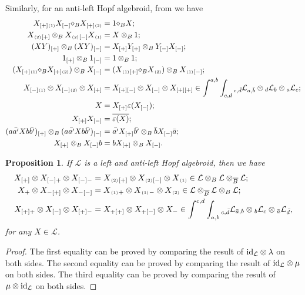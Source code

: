 \documentclass[a4paper,reqno]{amsart}
\newcommand*{\id}{\textup{id}}
\numberwithin{equation}{section}
\theoremstyle{plain}
\newtheorem{prop}[thm]{Proposition}
\theoremstyle{remark}
\numberwithin{equation}{section}
\newcommand{\ot}{\otimes}
\newcommand{\cL}{\mathcal{L}}
\newcommand{\BB}{\overline{B}}
\newcommand{\one}[1]{{#1}{}_{\scriptscriptstyle{(1)}}}
\newcommand{\two}[1]{{#1}{}_{\scriptscriptstyle{(2)}}}
\renewcommand{\o}{{}_{\scriptscriptstyle{(1)}}}
\renewcommand{\t}{{}_{\scriptscriptstyle{(2)}}}
\newcommand{\di}{{\diamond_{B}}}
\begin{document}
Similarly, for an anti-left Hopf algebroid, from \cite{BS} we have
\begin{align}
    \one{X_{[+]}}X_{[-]}\di{}\two{X_{[+]}}&=1\di{}X\label{equ. inverse mu 1};\\
    \two{X}{}_{[+]}\ot_{B}\two{X}{}_{[-]}\one{X}&=X\ot_{B}1\label{equ. inverse mu 2};\\
    (XY)_{[+]}\ot_{B}(XY)_{[-]}&=X_{[+]}Y_{[+]}\ot_{B}Y_{[-]}X_{[-]}\label{equ. inverse mu 3};\\
    1_{[+]}\ot_{B}1_{[-]}&=1\ot_{B}1\label{equ. inverse mu 4};\\
    (\one{X_{[+]}}\di{}\two{X_{[+]}})\ot_{B}X_{[-]}&=(\one{X}{}_{[+]}\di{}\two{X})\ot_{B}\one{X}{}_{[-]}\label{equ. inverse mu 5};\\
    \one{X_{[-]}}\ot{}\two{X_{[-]}}\ot X_{[+]}&=X_{[+][-]}\ot{}X_{[-]}\ot X_{[+][+]}\in \int^{a,b}\int_{c,d}{}_{c,\Bar{d}}\cL_{a,\Bar{b}}\ot {}_{d}\cL_{b}\ot {}_{a}\cL_{c}\label{equ. inverse mu 6};\\
    X&=X_{[+]}\varepsilon(X_{[-]})\label{equ. inverse mu 7};\\
    X_{[+]}X_{[-]}&=\overline{\varepsilon(X)}\label{equ. inverse mu 8};\\
    (a\Bar{a'}Xb\Bar{b'})_{[+]}\ot_{B}(a\Bar{a'}Xb\Bar{b'})_{[-]}&=\Bar{a'}X_{[+]}\Bar{b'}\ot_{B}\Bar{b}X_{[-]}\Bar{a}\label{equ. inverse mu 9};\\
    X_{[+]}\ot_{B}X_{[-]}b&=bX_{[+]}\ot_{B}X_{[-]}\label{equ. inverse mu 10}.
\end{align}

\begin{prop}\label{prop. anti left and left Galois maps}
    If $\cL$ is a left and anti-left Hopf algebroid, then we have
    \begin{align}\label{mixed coass 1}
        X_{[+]}\ot X_{[-]+}\ot X_{[-]-}&=X\t{}_{[+]}\ot X\t{}_{[-]}\ot X\o\in \cL\ot_{B}\cL\ot_{\BB}\cL;\\\label{mixed coass 2}
        X_{+}\ot X_{-[+]}\ot X_{-[-]}&=X\o{}_{+}\ot X\o{}_{-}\ot X\t\in \cL\ot_{\BB}\cL\ot_{B}\cL;\\\label{mixed coass 3}
        X_{[+]+}\ot X_{[-]}\ot X_{[+]-}&=X_{+[+]}\ot X_{+[-]}\ot X_{-}\in \int^{c,d}\int_{a,b} {}_{c, \Bar{d}}\cL_{\Bar{a}, b}\ot {}_{b}\cL_{c}\ot {}_{\Bar{a}}\cL_{\Bar{d}},
    \end{align}
   for any $X\in\cL$.
\end{prop}
\begin{proof}
    The first equality can be proved by comparing the result of $\id_{\cL}\ot \lambda $ on both sides. The second
 equality can be proved by comparing the result of $\id_{\cL}\ot \mu$ on both sides. The third
 equality can be proved by comparing the result of $\mu\ot \id_{\cL}$ on both sides.
\end{proof}
\end{document}
